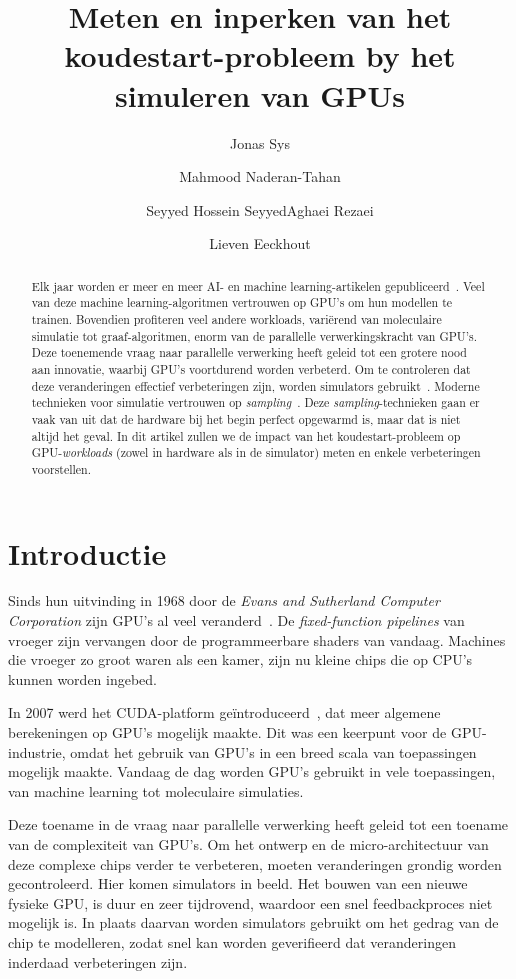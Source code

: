 \documentclass[5p,numvwe]{elsarticle}
\title{Meten en inperken van het koudestart-probleem by het simuleren van GPUs}
\author{Jonas Sys \fnref{fn1}}
\author{Mahmood Naderan-Tahan \fnref{fn2}}
\author{Seyyed Hossein SeyyedAghaei Rezaei \fnref{fn2}}
\author{Lieven Eeckhout \fnref{fn2}}
\begin{document}
    \begin{abstract}
        Elk jaar worden er meer en meer AI- en machine learning-artikelen gepubliceerd~\cite{aiindex}.
        Veel van deze machine learning-algoritmen vertrouwen op GPU's om hun modellen te trainen.
        Bovendien profiteren veel andere workloads, variërend van moleculaire simulatie tot graaf-algoritmen, enorm van de parallelle verwerkingskracht van GPU's.
        Deze toenemende vraag naar parallelle verwerking heeft geleid tot een grotere nood aan innovatie, waarbij GPU's voortdurend worden verbeterd.
        Om te controleren dat deze veranderingen effectief verbeteringen zijn, worden simulators gebruikt~\cite{accelsim}.
        Moderne technieken voor simulatie vertrouwen op \textit{sampling}~\cite{pks, sieve}.
        Deze \textit{sampling}-technieken gaan er vaak van uit dat de hardware bij het begin perfect opgewarmd is, maar dat is niet altijd het geval.
        In dit artikel zullen we de impact van het koudestart-probleem op GPU-\textit{workloads} (zowel in hardware als in de simulator) meten en enkele verbeteringen voorstellen.
    \end{abstract}

    \maketitle

    \section{Introductie}\label{sec:introductie}
    Sinds hun uitvinding in 1968 door de \textit{Evans and Sutherland Computer Corporation} zijn GPU's al veel veranderd~\cite{gpu-evolution}.
    De \textit{fixed-function pipelines} van vroeger zijn vervangen door de programmeerbare shaders van vandaag.
    Machines die vroeger zo groot waren als een kamer, zijn nu kleine chips die op CPU's kunnen worden ingebed.

    In 2007 werd het CUDA-platform geïntroduceerd~\cite{cuda, cuda-prog}, dat meer algemene berekeningen op GPU's mogelijk maakte.
    Dit was een keerpunt voor de GPU-industrie, omdat het gebruik van GPU's in een breed scala van toepassingen mogelijk maakte.
    Vandaag de dag worden GPU's gebruikt in vele toepassingen, van machine learning tot moleculaire simulaties.

    Deze toename in de vraag naar parallelle verwerking heeft geleid tot een toename van de complexiteit van GPU's.
    Om het ontwerp en de micro-architectuur van deze complexe chips verder te verbeteren, moeten veranderingen grondig worden gecontroleerd.
    Hier komen simulators in beeld.
    Het bouwen van een nieuwe fysieke GPU, is duur en zeer tijdrovend, waardoor een snel feedbackproces niet mogelijk is.
    In plaats daarvan worden simulators gebruikt om het gedrag van de chip te modelleren, zodat snel kan worden geverifieerd dat veranderingen inderdaad verbeteringen zijn.
\end{document}
